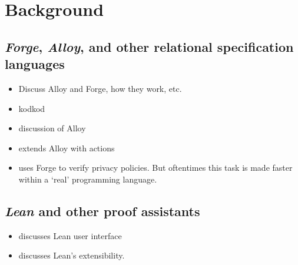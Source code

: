 \section{Background}

\subsection{\emph{Forge}, \emph{Alloy}, and other relational specification languages}
\begin{itemize}
    \item Discuss Alloy and Forge, how they work, etc. 
    \item \cite{torlak2007kodkod} kodkod
    \item \cite{torlak2013applications} discussion of Alloy
    \item \cite{frias2005dynalloy} extends Alloy with actions
    \item \cite{srajesh-honorsthesis,lzhu-honorsthesis} uses Forge to verify privacy policies. But oftentimes this task is made faster within a `real' programming language. 
\end{itemize}

\subsection{\emph{Lean} and other proof assistants}
\begin{itemize}
    \item \cite{nawrocki2023extensible} discusses Lean user interface
    \item \cite{moura2021lean} discusses Lean's extensibility. 
\end{itemize}

